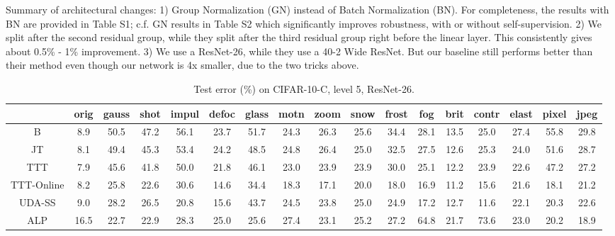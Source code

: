 \documentclass{article}
\theoremstyle{plain}
\theoremstyle{remark}
\theoremstyle{definition}
\begin{document}
Summary of architectural changes: 1) Group Normalization (GN) instead of Batch Normalization (BN). For completeness, the results with BN are provided in Table S1; c.f. GN results in Table S2 which significantly improves robustness, with or without self-supervision. 2) We split after the second residual group, while they split after the third residual group right before the linear layer. This consistently gives about 0.5\% - 1\% improvement. 3) We use a ResNet-26, while they use a 40-2 Wide ResNet. But our baseline still performs better than their method even though our network is 4x smaller, due to the two tricks above.

\newpage
\begin{table}[ht]
	\footnotesize
	\begin{center}
		{
			\setlength\tabcolsep{3.5pt}
			\begin{tabular}{c|c|c|c|c|c|c|c|c|c|c|c|c|c|c|c|c}
				\hline
				& orig& gauss& shot& impul& defoc& glass& motn& zoom& snow& frost& fog& brit& contr& elast& pixel& jpeg\\
				\hline
				B & 8.9& 50.5& 47.2& 56.1& 23.7& 51.7& 24.3& 26.3& 25.6& 34.4& 28.1& 13.5& 25.0& 27.4& 55.8& 29.8\\
				\hline
				JT & 8.1& 49.4& 45.3& 53.4& 24.2& 48.5& 24.8& 26.4& 25.0& 32.5& 27.5& 12.6& 25.3& 24.0& 51.6& 28.7\\
				\hline
				TTT & 7.9& 45.6& 41.8& 50.0& 21.8& 46.1& 23.0& 23.9& 23.9& 30.0& 25.1& 12.2& 23.9& 22.6& 47.2& 27.2\\
				\hline
				TTT-Online & 8.2& 25.8& 22.6& 30.6& 14.6& 34.4& 18.3& 17.1& 20.0& 18.0& 16.9& 11.2& 15.6& 21.6& 18.1& 21.2\\
				\hline
				UDA-SS & 9.0& 28.2& 26.5& 20.8& 15.6& 43.7& 24.5& 23.8& 25.0& 24.9& 17.2& 12.7& 11.6& 22.1& 20.3& 22.6\\
				\hline
				ALP & 16.5& 22.7& 22.9& 28.3& 25.0& 25.6& 27.4& 23.1& 25.2& 27.2& 64.8& 21.7& 73.6& 23.0& 20.2& 18.9\\
				\hline
			\end{tabular}
		}
	\end{center}
	\vspace{-2ex}
	\caption{
		Test error (\%) on CIFAR-10-C, level 5, ResNet-26.
	}
\label{table:full_c10c}
\end{table} 
\end{document}
